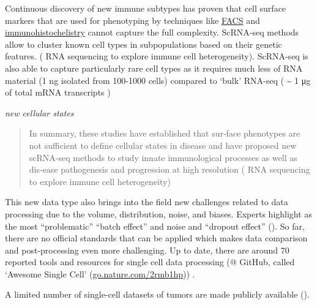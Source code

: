 \documentclass[12pt,]{book}
\theoremstyle{definition}
\theoremstyle{definition}
\theoremstyle{definition}
\theoremstyle{remark}
\begin{document}
Continuous discovery of new immune subtypes has proven that cell surface
markers that are used for phenotyping by techniques like
\protect\hyperlink{facs}{FACS} and
\protect\hyperlink{staining}{immunohistochelistry} cannot capture the
full complexity. ScRNA-seq methods allow to cluster known cell types in
subpopulations based on their genetic features. (\citet{Single-cell} RNA
sequencing to explore immune cell heterogeneity). ScRNA-seq is also able
to capture particularly rare cell types as it requires much less of RNA
material (1 ng isolated from 100-1000 cells) compared to `bulk' RNA-seq
( \textasciitilde{} 1 μg of total mRNA transcripts )

\emph{new cellular states}

\begin{quote}
In summary, these studies have established that sur‑face phenotypes are
not sufficient to define cellular states in disease and have proposed
new scRNA‑seq methods to study innate immunological processes as well as
dis‑ease pathogenesis and progression at high resolution
(\citet{Single-cell} RNA sequencing to explore immune cell
heterogeneity)
\end{quote}

This new data type also brings into the field new challenges related to
data processing due to the volume, distribution, noise, and biases.
Experts highlight as the most ``problematic'' ``batch effect'' and noise
and ``dropout effect''
(\citet{https://www.nature.com/news/single-cell-sequencing-made-simple-1.22233}).
So far, there are no official standards that can be applied which makes
data comparison and post-processing even more challenging. Up to date,
there are around 70 reported tools and resources for single cell data
processing (@ GitHub, called `Awesome Single Cell'
(\href{http://go.nature.com/2rmb1hp}{go.nature.com/2rmb1hp})) .

A limited number of single-cell datasets of tumors are made publicly
available (\citet{TABLE}).
\end{document}
